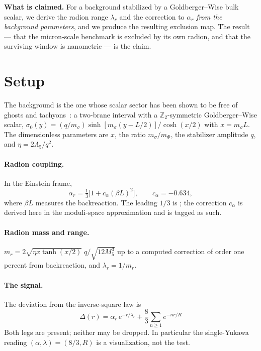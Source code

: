 \documentclass[11pt,a4paper]{article}
\begin{document}
\medskip
\noindent\textbf{What is claimed.} For a background stabilized by a
Goldberger--Wise bulk scalar, we derive the radion range $\lambda_r$
and the correction to $\alpha_r$ \emph{from the background parameters},
and we produce the resulting exclusion map. The result --- that the
micron-scale benchmark is excluded by its own radion, and that the
surviving window is nanometric --- is the claim.

\section{Setup}

The background is the one whose scalar sector has been shown to be free
of ghosts and tachyons~\cite{PaperA}: a two-brane interval with a
$\mathbb{Z}_2$-symmetric Goldberger--Wise scalar,
$\sigma_0(y)=(q/m_\sigma)\sinh[m_\sigma(y-L/2)]/\cosh(x/2)$ with
$x=m_\sigma L$. The dimensionless parameters are $x$, the ratio
$m_\sigma/m_\Phi$, the stabilizer amplitude $q$, and
$\eta=2\Lambda_5/q^2$.

\paragraph{Radion coupling.} In the Einstein frame,
\begin{equation}
\alpha_r=\tfrac13\Big[1+c_\alpha(\beta L)^2\Big],\qquad
c_\alpha=-0.634,
\label{eq:alpha}
\end{equation}
where $\beta L$ measures the backreaction. The leading $1/3$ is
\cite{AHH}; the correction $c_\alpha$ is derived here in the
moduli-space approximation and is tagged as such.

\paragraph{Radion mass and range.}
$m_r=2\sqrt{\eta x\tanh(x/2)}\;q/\sqrt{12M_5^3}$ up to a computed
correction of order one percent from backreaction, and
$\lambda_r=1/m_r$.

\paragraph{The signal.} The deviation from the inverse-square law is
\begin{equation}
\boxed{\;\Delta(r)=\alpha_r\,e^{-r/\lambda_r}
+\frac{8}{3}\sum_{n\ge1}e^{-nr/R}\;}
\label{eq:signal}
\end{equation}
Both legs are present; neither may be dropped. In particular the
single-Yukawa reading $(\alpha,\lambda)=(8/3,R)$ is a visualization,
not the test.
\end{document}
